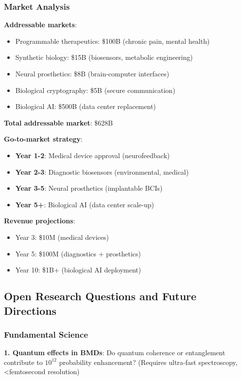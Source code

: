 \documentclass[11pt,a4paper]{article}
\begin{document}
\subsubsection{Market Analysis}

\textbf{Addressable markets}:
\begin{itemize}
\item Programmable therapeutics: \$100B (chronic pain, mental health)
\item Synthetic biology: \$15B (biosensors, metabolic engineering)
\item Neural prosthetics: \$8B (brain-computer interfaces)
\item Biological cryptography: \$5B (secure communication)
\item Biological AI: \$500B (data center replacement)
\end{itemize}

\textbf{Total addressable market}: \$628B

\textbf{Go-to-market strategy}:
\begin{itemize}
\item \textbf{Year 1-2}: Medical device approval (neurofeedback)
\item \textbf{Year 2-3}: Diagnostic biosensors (environmental, medical)
\item \textbf{Year 3-5}: Neural prosthetics (implantable BCIs)
\item \textbf{Year 5+}: Biological AI (data center scale-up)
\end{itemize}

\textbf{Revenue projections}:
\begin{itemize}
\item Year 3: \$10M (medical devices)
\item Year 5: \$100M (diagnostics + prosthetics)
\item Year 10: \$1B+ (biological AI deployment)
\end{itemize}

\subsection{Open Research Questions and Future Directions}

\subsubsection{Fundamental Science}

\textbf{1. Quantum effects in BMDs}: Do quantum coherence or entanglement contribute to $10^{12}$ probability enhancement? (Requires ultra-fast spectroscopy, <femtosecond resolution)
\end{document}
